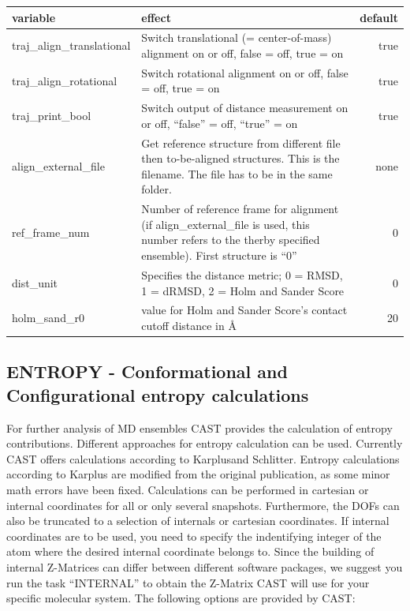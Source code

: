 \documentclass[10pt,a4paper]{article} %
\begin{document}
	\begin{tabularx}{\textwidth}{l|X|r}
		variable & effect & default\\
		\hline
		traj\_align\_translational & Switch translational (= center-of-mass) alignment on or off, false = off, true = on & true\\
		traj\_align\_rotational & Switch rotational alignment\cite{kabsch1, kabsch2} on or off, false = off, true = on & true\\
		traj\_print\_bool & Switch output of distance measurement on or off, ``false'' = off, ``true'' = on & true\\
		align\_external\_file & Get reference structure from different file then to-be-aligned structures. This is the filename. The file has to be in the same folder. & none\\
		ref\_frame\_num & Number of reference frame for alignment (if align\_external\_file is used, this number refers to the therby specified ensemble). First structure is ``0'' & 0\\
		dist\_unit & Specifies the distance metric; 0 = RMSD, 1 = dRMSD, 2 = Holm and Sander Score & 0\\
		holm\_sand\_r0 & value for Holm and Sander Score's contact cutoff distance in \AA & 20 \\
		
	\end{tabularx}
	
	\subsection{ENTROPY - Conformational and Configurational entropy calculations}
	For further analysis of \acl{MD} ensembles \ac{CAST} provides the calculation of entropy contributions. Different approaches for entropy calculation can be used. Currently \ac{CAST} offers calculations according to Karplus\supercite{karplus_entropy}and Schlitter\supercite{schlitter_entropy}. Entropy calculations according to Karplus are modified from the original publication, as some minor math errors have been fixed. Calculations can be performed in cartesian or internal coordinates for all or only several snapshots. Furthermore, the \acp{DOF} can also be truncated to a selection of internals or cartesian coordinates. If internal coordinates are to be used, you need to specify the indentifying integer of the atom where the desired internal coordinate belongs to. Since the building of internal Z-Matrices can differ between different software packages, we suggest you run the task ``INTERNAL'' to obtain the Z-Matrix \ac{CAST} will use for your specific molecular system. The following options are provided by \ac{CAST}: \\~\\
	
\end{document}
